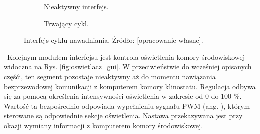 \begin{figure}
	\centering
	
	\begin{subfigure}[h]{.49\textwidth}
		\centering
		\setlength{\fboxsep}{0pt}
		\setlength{\fboxrule}{1pt}
		\caption{Nieaktywny interfejs.}
		\label{fig:woda_gui_nieaktywne}
	\end{subfigure}
	\hfill%
	\begin{subfigure}[h]{.49\textwidth}
		\centering
		\setlength{\fboxsep}{0pt}
		\setlength{\fboxrule}{1pt}
		\caption{Trwający cykl.} 
		\label{fig:woda_gui_aktywne}
	\end{subfigure}
	
	\caption{Interfejs cyklu nawadniania. Źródło: [opracowanie własne].}
	\label{fig:nawadnianie_gui}
	
\end{figure}\
Kolejnym modułem interfejsu jest kontrola oświetlenia komory środowiskowej widoczna na Rys. \ref{fig:oswietlacz_gui}. W przeciwieństwie do wcześniej opisanych częśći, ten segment pozostaje nieaktywny aż do momentu nawiązania bezprzewodowej komunikacji z komputerem komory klinostatu. Regulacja odbywa się za pomocą określenia intensywności oświetlenia w zakresie od 0 do 100 \%. Wartość ta bezpośrednio odpowiada wypełnieniu sygnału PWM (ang. ), którym sterowane są odpowiednie sekcje oświetlenia. Nastawa przekazywana jest przy okazji wymiany informacji z komputerem komory środowiskowej.\\

